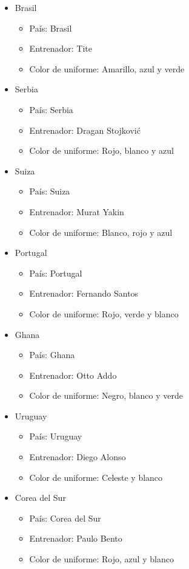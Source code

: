 \begin{itemize}
\begin{itemize}
        \end{itemize}
    \item Brasil
        \begin{itemize}
            \item País: Brasil
            \item Entrenador: Tite
            \item Color de uniforme: Amarillo, azul y verde
        \end{itemize}
    \item Serbia
        \begin{itemize}
            \item País: Serbia
            \item Entrenador: Dragan Stojković
            \item Color de uniforme: Rojo, blanco y azul
        \end{itemize}
    \item Suiza
        \begin{itemize}
            \item País: Suiza
            \item Entrenador: Murat Yakin
            \item Color de uniforme: Blanco, rojo y azul
        \end{itemize}
    \item Portugal
        \begin{itemize}
            \item País: Portugal
            \item Entrenador: Fernando Santos
            \item Color de uniforme: Rojo, verde y blanco
        \end{itemize}
    \item Ghana
        \begin{itemize}
            \item País: Ghana
            \item Entrenador: Otto Addo
            \item Color de uniforme: Negro, blanco y verde
        \end{itemize}
    \item Uruguay
        \begin{itemize}
            \item País: Uruguay
            \item Entrenador: Diego Alonso
            \item Color de uniforme: Celeste y blanco
        \end{itemize}
    \item Corea del Sur
        \begin{itemize}
            \item País: Corea del Sur
            \item Entrenador: Paulo Bento
            \item Color de uniforme: Rojo, azul y blanco
        \end{itemize}
\end{itemize}



